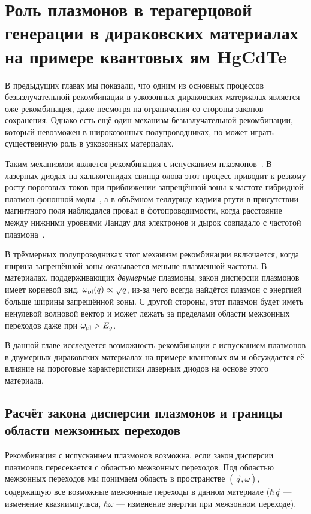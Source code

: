 \chapter{Роль плазмонов в терагерцовой генерации в дираковских материалах на примере квантовых ям HgCdTe} \label{chapter:plasmon}
В предыдущих главах мы показали, что одним из основных процессов безызлучательной рекомбинации в узкозонных дираковских материалах является оже-рекомбинация, даже несмотря на ограничения со стороны законов сохранения. Однако есть ещё один механизм безызлучательной рекомбинации, который невозможен в широкозонных полупроводниках, но может играть существенную роль в узкозонных материалах.

Таким механизмом является рекомбинация с испусканием плазмонов~\cite{recombination_in_narrow_gap}. В лазерных диодах на халькогенидах свинца-олова этот процесс приводит к резкому росту пороговых токов при приближении запрещённой зоны к частоте гибридной плазмон-фононной моды~\cite{lead_salt-plasmon}, а в объёмном теллуриде кадмия-ртути в присутствии магнитного поля наблюдался провал в фотопроводимости, когда расстояние между нижними уровнями Ландау для электронов и дырок совпадало с частотой плазмона~\cite{HgCdTe-plasmon_photoconductivity}.

В трёхмерных полупроводниках этот механизм рекомбинации включается, когда ширина запрещённой зоны оказывается меньше плазменной частоты. В материалах, поддерживающих \emph{двумерные} плазмоны, закон дисперсии плазмонов имеет корневой вид, $\omega_{\rm pl}(q) \propto \sqrt{q}$, из-за чего всегда найдётся плазмон с энергией больше ширины запрещённой зоны. С другой стороны, этот плазмон будет иметь ненулевой волновой вектор и может лежать за пределами области межзонных переходов даже при $\omega_{\rm pl} > E_g$.

В данной главе исследуется возможность рекомбинации с испусканием плазмонов в двумерных дираковских материалах на примере квантовых ям \HgCdTe{} и обсуждается её влияние на пороговые характеристики лазерных диодов на основе этого материала.

\section{Расчёт закона дисперсии плазмонов и границы области межзонных переходов} \label{sec:plasmon-dispersion}
Рекомбинация с испусканием плазмонов возможна, если закон дисперсии плазмонов пересекается с областью межзонных переходов. Под областью межзонных переходов мы понимаем область в пространстве $(\vec{q}, \omega)$, содержащую все возможные межзонные переходы в данном материале ($\hbar\vec{q}$ --- изменение квазиимпульса, $\hbar\omega$ --- изменение энергии при межзонном переходе).

